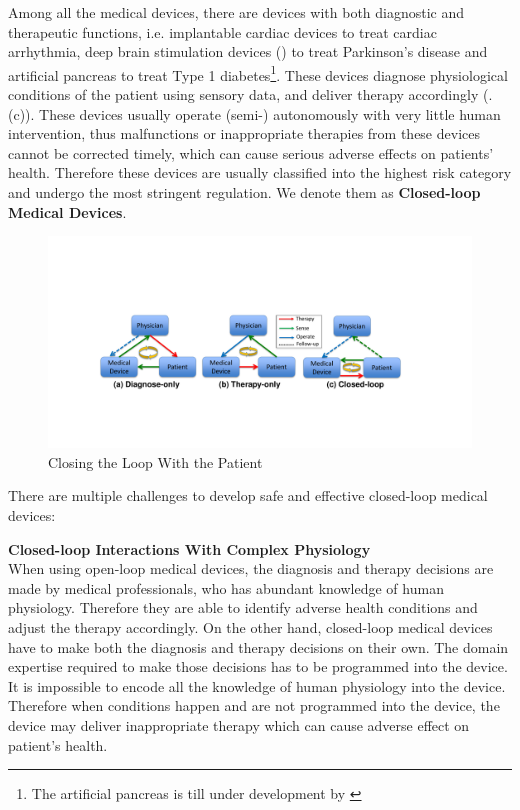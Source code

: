 Among all the medical devices, there are devices with both diagnostic and therapeutic functions, i.e. implantable cardiac devices to treat cardiac arrhythmia, deep brain stimulation devices (\cite{Brain_sti}) to treat Parkinson's disease and artificial pancreas to treat Type 1 diabetes\footnote{The artificial pancreas is till under development by \cite{}}. These devices diagnose physiological conditions of the patient using sensory data, and deliver therapy accordingly (.(c)). These devices usually operate (semi-) autonomously with very little human intervention, thus malfunctions or inappropriate therapies from these devices cannot be corrected timely, which can cause serious adverse effects on patients' health. Therefore these devices are usually classified into the highest risk category and undergo the most stringent regulation. We denote them as \textbf{Closed-loop Medical Devices}. 
\begin{figure}[t]
		\centering
		\includegraphics[width=\textwidth]{figs/closed-loop.pdf}
		\caption{\small Closing the Loop With the Patient}
		\label{fig:closed-loop}
\end{figure}
There are multiple challenges to develop safe and effective closed-loop medical devices:

\textbf{Closed-loop Interactions With Complex Physiology}\\
When using open-loop medical devices, the diagnosis and therapy decisions are made by medical professionals, who has abundant knowledge of human physiology. Therefore they are able to identify adverse health conditions and adjust the therapy accordingly. On the other hand, closed-loop medical devices have to make both the diagnosis and therapy decisions on their own. The domain expertise required to make those decisions has to be programmed into the device. It is impossible to encode all the knowledge of human physiology into the device. Therefore when conditions happen and are not programmed into the device, the device may deliver inappropriate therapy which can cause adverse effect on patient's health. 

